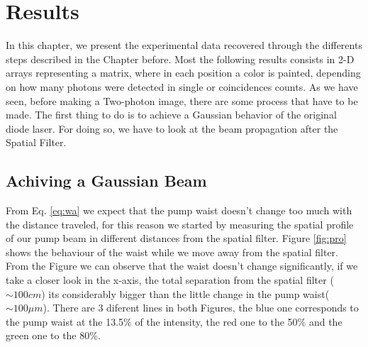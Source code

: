 
\chapter{Results} %

\label{Chapter4} %

In this chapter, we present the experimental data recovered through the differents 
steps described in the Chapter before. Most the following results consists in 
2-D arrays representing a matrix, where in each position a color is painted, depending
on how many photons were detected in single or coincidences counts.
As we have seen, before making a Two-photon image, there are some process 
that have to be made. The first thing to do is to achieve a Gaussian behavior 
of the original diode laser. For doing so, we have to look at the beam propagation after 
the Spatial Filter. 

\section{Achiving a Gaussian Beam}

From Eq. \ref{eq:wa} we expect that the pump waist doesn't change too much with the distance
traveled, for this reason we started by measuring the spatial profile of our pump beam in different 
distances from the spatial filter. Figure \ref{fig:pro} shows the behaviour of the waist while we move away from the spatial filter.
From the Figure we can observe that the waist doesn't change significantly, if we take a closer look in the x-axis, the total separation from the 
spatial filter ($\sim100cm$)  its considerably bigger than the little change in the pump waist($\sim 100 \mu m$). There are 3 diferent lines in 
both Figures, the blue one corresponds to the pump waist at the 13.5\% of the intensity, the red one to the 50\% and the green one to the 80\%.


